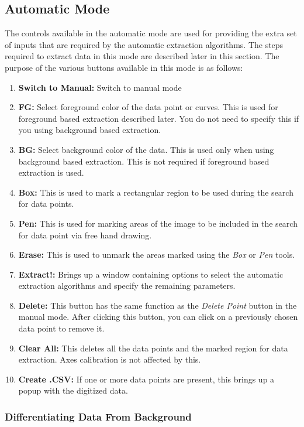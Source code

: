 \documentclass[letterpaper, 10pt]{article}
\begin{document}
\subsection{Automatic Mode}
The controls available in the automatic mode are used for providing the extra set of inputs that are required by the automatic extraction algorithms. The steps required to extract data in this mode are described later in this section. The purpose of the various buttons available in this mode is as follows:
\begin{enumerate}
\item{{\bf Switch to Manual: }Switch to manual mode}
\item{{\bf FG: }Select foreground color of the data point or curves. This is used for foreground based extraction described later. You do not need to specify this if you using background based extraction.}
\item{{\bf BG: }Select background color of the data. This is used only when using background based extraction. This is not required if foreground based extraction is used.}
\item{{\bf Box: }This is used to mark a rectangular region to be used during the search for data points.}
\item{{\bf Pen: }This is used for marking areas of the image to be included in the search for data point via free hand drawing.}
\item{{\bf Erase: }This is used to unmark the areas marked using the \emph{Box} or \emph{Pen} tools.}
\item{{\bf Extract!: }Brings up a window containing options to select the automatic extraction algorithms and specify the remaining parameters.}
\item{{\bf Delete: }This button has the same function as the \emph{Delete Point} button in the manual mode. After clicking this button, you can click on a previously chosen data point to remove it.}
\item{{\bf Clear All: }This deletes all the data points and the marked region for data extraction. Axes calibration is not affected by this.}
\item{{\bf Create .CSV: }If one or more data points are present, this brings up a popup with the digitized data.}
\end{enumerate}
\subsubsection{Differentiating Data From Background}
\end{document}
